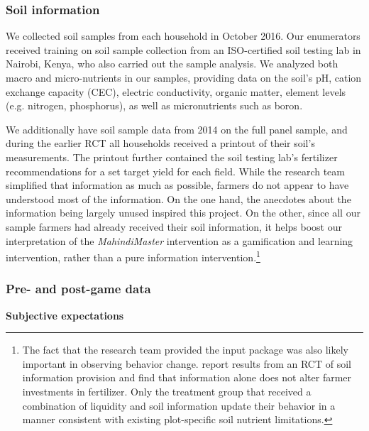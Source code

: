 \documentclass[12pt,letterpaper]{article}
\begin{document}
\subsubsection{Soil information}\label{sec:soil_sample_data}

We collected soil samples from each household in October 2016. Our enumerators received training on soil sample collection from an ISO-certified soil testing lab in Nairobi, Kenya, who also carried out the sample analysis. We analyzed both macro and micro-nutrients in our samples, providing data on the soil's pH, cation exchange capacity (CEC), electric conductivity, organic matter, element levels (e.g. nitrogen, phosphorus), as well as micronutrients such as boron.

We additionally have soil sample data from 2014 on the full panel sample, and during the earlier RCT all households received a printout of their soil's measurements. The printout further contained the soil testing lab's fertilizer recommendations for a set target yield for each field. While the research team simplified that information as much as possible, farmers do not appear to have understood most of the information. On the one hand, the anecdotes about the information being largely unused inspired this project. On the other, since all our sample farmers had already received their soil information, it helps boost our interpretation of the \textit{MahindiMaster} intervention as a gamification and learning intervention, rather than a pure information intervention.\footnote{The fact that the research team provided the input package was also likely important in observing behavior change. \cite{harou_sitespecific2018} report results from an RCT of soil information provision and find that information alone does not alter farmer investments in fertilizer. Only the treatment group that received a combination of liquidity and soil information update their behavior in a manner consistent with existing plot-specific soil nutrient limitations.}

\subsubsection{Pre- and post-game data}\label{sec:pre_post_data}

\textbf{Subjective expectations}
\end{document}
